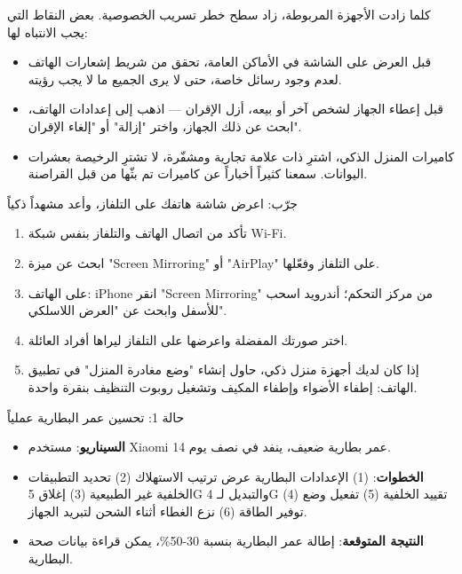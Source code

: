 
كلما زادت الأجهزة المربوطة، زاد سطح خطر تسريب الخصوصية. بعض النقاط التي يجب الانتباه لها:

\begin{itemize}
  \item قبل العرض على الشاشة في الأماكن العامة، تحقق من شريط إشعارات الهاتف لعدم وجود رسائل خاصة، حتى لا يرى الجميع ما لا يجب رؤيته.
  \item قبل إعطاء الجهاز لشخص آخر أو بيعه، أزل الإقران — اذهب إلى إعدادات الهاتف، ابحث عن ذلك الجهاز، واختر "إزالة" أو "إلغاء الإقران".
  \item كاميرات المنزل الذكي، اشترِ ذات علامة تجارية ومشفّرة، لا تشترِ الرخيصة بعشرات اليوانات. سمعنا كثيراً أخباراً عن كاميرات تم بثّها من قبل القراصنة.
\end{itemize}

\begin{tcbpractice}{جرّب: اعرض شاشة هاتفك على التلفاز، وأعد مشهداً ذكياً}
\begin{enumerate}
  \item تأكد من اتصال الهاتف والتلفاز بنفس شبكة Wi-Fi.
  \item ابحث عن ميزة "Screen Mirroring" أو "AirPlay" على التلفاز وفعّلها.
  \item على الهاتف: iPhone انقر "Screen Mirroring" من مركز التحكم؛ أندرويد اسحب للأسفل وابحث عن "العرض اللاسلكي".
  \item اختر صورتك المفضلة واعرضها على التلفاز ليراها أفراد العائلة.
  \item إذا كان لديك أجهزة منزل ذكي، حاول إنشاء "وضع مغادرة المنزل" في تطبيق الهاتف: إطفاء الأضواء وإطفاء المكيف وتشغيل روبوت التنظيف بنقرة واحدة.
\end{enumerate}

\end{tcbpractice}

\begin{tcbinfo}{حالة 1: تحسين عمر البطارية عملياً}
\begin{itemize}
  \item \textbf{السيناريو}: مستخدم Xiaomi 14 عمر بطارية ضعيف، ينفد في نصف يوم.
  \item \textbf{الخطوات}: (1) الإعدادات البطارية عرض ترتيب الاستهلاك (2) تحديد التطبيقات الخلفية غير الطبيعية (3) إغلاق 5G والتبديل لـ 4G (4) تقييد الخلفية (5) تفعيل وضع توفير الطاقة (6) نزع الغطاء أثناء الشحن لتبريد الجهاز.
  \item \textbf{النتيجة المتوقعة}: إطالة عمر البطارية بنسبة 30-50\%، يمكن قراءة بيانات صحة البطارية.
\end{itemize}

\end{tcbinfo}

